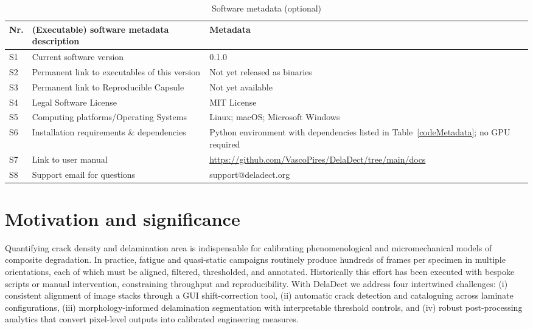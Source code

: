 \documentclass[preprint,12pt,a4paper]{elsarticle}
\begin{document}
\begin{table}[!h]
\begin{tabular}{|l|p{6.5cm}|p{6.5cm}|}
\hline
\textbf{Nr.} & \textbf{(Executable) software metadata description} & \textbf{Metadata} \\
\hline
S1 & Current software version & 0.1.0 \\
\hline
S2 & Permanent link to executables of this version & Not yet released as binaries \\
\hline
S3 & Permanent link to Reproducible Capsule & Not yet available \\
\hline
S4 & Legal Software License & MIT License \\
\hline
S5 & Computing platforms/Operating Systems & Linux; macOS; Microsoft Windows \\
\hline
S6 & Installation requirements \& dependencies & Python environment with dependencies listed in Table~\ref{codeMetadata}; no GPU required \\
\hline
S7 & Link to user manual & \url{https://github.com/VascoPires/DelaDect/tree/main/docs} \\
\hline
S8 & Support email for questions & support@deladect.org \\
\hline
\end{tabular}
\caption{Software metadata (optional)}
\label{executabelMetadata}
\end{table}

\section{Motivation and significance}
Quantifying crack density and delamination area is indispensable for calibrating
phenomenological and micromechanical models of composite degradation. In practice, fatigue and
quasi-static campaigns routinely produce hundreds of frames per specimen in multiple orientations,
each of which must be aligned, filtered, thresholded, and annotated. Historically this effort has been
executed with bespoke scripts or manual intervention, constraining throughput and reproducibility. With
DelaDect we address four intertwined challenges: (i) consistent alignment of image stacks through a GUI
shift-correction tool, (ii) automatic crack detection and cataloguing across laminate configurations,
(iii) morphology-informed delamination segmentation with interpretable threshold controls, and (iv)
robust post-processing analytics that convert pixel-level outputs into calibrated engineering measures.
\end{document}
